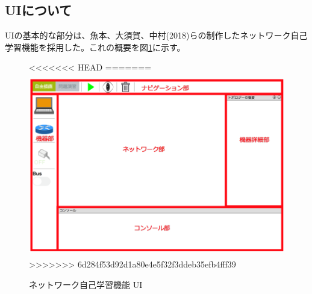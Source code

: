 \subsection{UIについて}
\label{tag:ui}
UIの基本的な部分は、魚本、大須賀、中村(2018)らの制作したネットワーク自己学習機能を採用した。これの概要を図\ref{fig:simu}に示す。

\begin{figure}[htbp]
  \begin{center}
<<<<<<< HEAD
=======
    \includegraphics[clip,width=12.0cm,height=8.0cm]{img/simu2.png}
>>>>>>> 6d284f53d92d1a80e4e5f32f3ddeb35efb4fff39
    \caption{ネットワーク自己学習機能 UI}
    \label{fig:simu}
  \end{center}
\end{figure}

